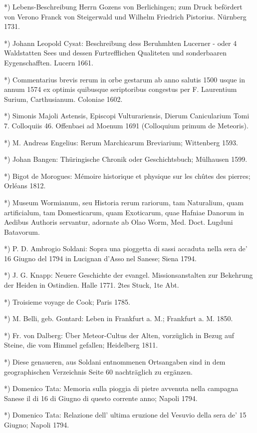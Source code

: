\documentclass[a4paper, 8pt, oneside, polutonikogreek, german]{article}
\begin{document}
*) Lebens-Beschreibung Herrn Gozens von Berlichingen; zum Druck befördert von Verono Franck von Steigerwald und Wilhelm Friedrich Pistorius. Nürnberg 1731.

*) Johann Leopold Cysat: Beschreibung dess Beruhmhten Lucerner - oder 4 Waldstatten Sees und dessen Furtrefflichen Qualiteten und sonderbaaren Eygenschafften. Lucern 1661.

*) Commentarius brevis rerum in orbe gestarum ab anno salutis 1500 usque in annum 1574 ex optimis quibusque seriptoribus congestus per F. Laurentium Surium, Carthusianum. Coloniae 1602.

*) Simonis Majoli Astensis, Episcopi Vulturariensis, Dierum Canicularium Tomi 7. Colloquiis 46. Offenbaei ad Moenum 1691 (Colloquium primum de Meteoris).

*) M. Andreas Engelius: Rerum Marchicarum Breviarium; Wittenberg 1593.

*) Johan Bangen: Thüringische Chronik oder Geschichtsbuch; Mülhausen 1599.

*) Bigot de Morogues: Mémoire historique et physique sur les chûtes des pierres; Orléans 1812.

*) Museum Wormianum, seu Historia rerum rariorum, tam Naturalium, quam artificialum, tam Domesticarum, quam Exoticarum, quae Hafniae Danorum in Aedibus Authoris servantur, adornate ab Olao Worm, Med. Doct. Lugduni Batavorum.

*) P. D. Ambrogio Soldani: Sopra una pioggetta di sassi accaduta nella sera de' 16 Giugno del 1794 in Lucignan d'Asso nel Sanese; Siena 1794.

*) J. G. Knapp: Neuere Geschichte der evangel. Missionsanstalten zur Bekehrung der Heiden in Ostindien. Halle 1771. 2tes Stuck, 1te Abt.

*) Troisieme voyage de Cook; Paris 1785.

*) M. Belli, geb. Gontard: Leben in Frankfurt a. M.; Frankfurt a. M. 1850.

*) Fr. von Dalberg: Über Meteor-Cultus der Alten, vorzüglich in Bezug auf Steine, die vom Himmel gefallen; Heidelberg 1811.

*) Diese genaueren, aus Soldani entnommenen Ortsangaben sind in dem geographischen Verzeichnis Seite 60 nachträglich zu ergänzen.

*) Domenico Tata: Memoria sulla pioggia di pietre avvenuta nella campagna Sanese il di 16 di Giugno di questo corrente anno; Napoli 1794.

*) Domenico Tata: Relazione dell' ultima eruzione del Vesuvio della sera de' 15 Giugno; Napoli 1794.
\end{document}
